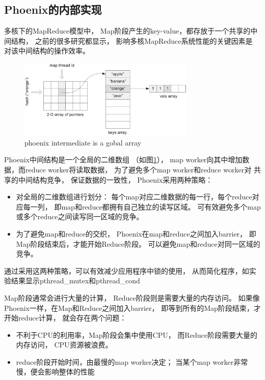 \subsection{Phoenix的内部实现}
多核下的MapReduce模型中，
Map阶段产生的key-value，都存放于一个共享的中间结构，
之前的很多研究都显示，
影响多核MapReduce系统性能的关键因素是
对该中间结构的操作效率\cite{mao2010metis}。
\begin{figure}[!h!t]  
    \centering
    \includegraphics[width=0.75\textwidth]{img/phoenix_intermediate.eps}
    \caption{phoenix intermediate is a gobal array}
    \label{phoenix:intermediate}
\end{figure}

Phoenix中间结构是一个全局的二维数组
（如图\ref{phoenix:intermediate}），
map worker向其中增加数据，而reduce worker将读取数据，
为了避免多个map worker和reduce worker对
共享的中间结构竞争， 保证数据的一致性，
Phoenix采用两种策略：
\begin{itemize}
  \item 对全局的二维数组进行划分：
  每个map对应二维数据的每一行，每个reduce对应每一列，
  即map和reduce都拥有自己独立的读写区域。
  可有效避免多个map或多个reduce之间读写同一区域的竞争。

  \item 为了避免map和reduce的交织，
  Phoenix在map和reduce之间加入barrier，
  即Map阶段结束后，才能开始Reduce阶段。
  可以避免map和reduce对同一区域的竞争。
\end{itemize}
通过采用这两种策略，可以有效减少应用程序中锁的使用，
从而简化程序，如实验结果显示pthread\_mutex和pthread\_cond

Map阶段通常会进行大量的计算，
Reduce阶段则是需要大量的内存访问。
如果像Phoenix一样，在Map和Reduce之间加入barrier，
即等到所有的Map阶段结束，才开始reduce计算，
就会存在两个问题：
\begin{itemize}
  \item 不利于CPU的利用率，Map阶段会集中使用CPU，
  而Reduce阶段需要大量的内存访问，
  CPU资源被浪费。
  \item reduce阶段开始时间，由最慢的map worker决定；
  当某个map worker非常慢，便会影响整体的性能
\end{itemize}

